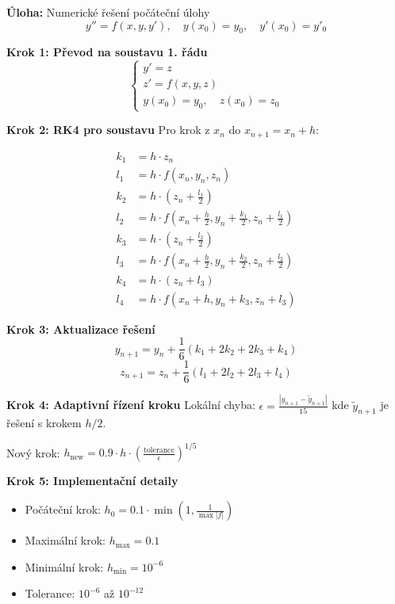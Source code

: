 \begin{example}
\label{ex:runge-kutta-4-rad}

\noindent\textbf{Úloha:} Numerické řešení počáteční úlohy
\[
y'' = f(x, y, y'), \quad y(x_0) = y_0, \quad y'(x_0) = y'_0
\]

\vspace{1.5\baselineskip}

\noindent\textbf{Krok 1: Převod na soustavu 1. řádu}
\[
\begin{cases}
y' = z \\
z' = f(x, y, z) \\
y(x_0) = y_0, \quad z(x_0) = z_0
\end{cases}
\]

\vspace{1\baselineskip}

\noindent\textbf{Krok 2: RK4 pro soustavu}
Pro krok z $x_n$ do $x_{n+1} = x_n + h$:

\begin{align*}
k_1 &= h \cdot z_n \\
l_1 &= h \cdot f(x_n, y_n, z_n) \\
k_2 &= h \cdot \left(z_n + \frac{l_1}{2}\right) \\
l_2 &= h \cdot f\left(x_n + \frac{h}{2}, y_n + \frac{k_1}{2}, z_n + \frac{l_1}{2}\right) \\
k_3 &= h \cdot \left(z_n + \frac{l_2}{2}\right) \\
l_3 &= h \cdot f\left(x_n + \frac{h}{2}, y_n + \frac{k_2}{2}, z_n + \frac{l_2}{2}\right) \\
k_4 &= h \cdot (z_n + l_3) \\
l_4 &= h \cdot f(x_n + h, y_n + k_3, z_n + l_3)
\end{align*}

\vspace{1\baselineskip}

\noindent\textbf{Krok 3: Aktualizace řešení}
\[
y_{n+1} = y_n + \frac{1}{6}(k_1 + 2k_2 + 2k_3 + k_4)
\]
\[
z_{n+1} = z_n + \frac{1}{6}(l_1 + 2l_2 + 2l_3 + l_4)
\]

\vspace{1\baselineskip}

\noindent\textbf{Krok 4: Adaptivní řízení kroku}
Lokální chyba: $\epsilon = \frac{|y_{n+1} - \tilde{y}_{n+1}|}{15}$
kde $\tilde{y}_{n+1}$ je řešení s krokem $h/2$.

Nový krok: $h_{\text{new}} = 0.9 \cdot h \cdot \left(\frac{\text{tolerance}}{\epsilon}\right)^{1/5}$

\vspace{1\baselineskip}

\noindent\textbf{Krok 5: Implementační detaily}
\begin{itemize}
\item Počáteční krok: $h_0 = 0.1 \cdot \min(1, \frac{1}{\max|f|})$
\item Maximální krok: $h_{\text{max}} = 0.1$
\item Minimální krok: $h_{\text{min}} = 10^{-6}$
\item Tolerance: $10^{-6}$ až $10^{-12}$
\end{itemize}

\end{example}

